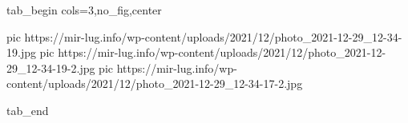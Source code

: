  
 
 
 
 


\ifcmt
  tab_begin cols=3,no_fig,center

     pic https://mir-lug.info/wp-content/uploads/2021/12/photo_2021-12-29_12-34-19.jpg
		 pic https://mir-lug.info/wp-content/uploads/2021/12/photo_2021-12-29_12-34-19-2.jpg
		 pic https://mir-lug.info/wp-content/uploads/2021/12/photo_2021-12-29_12-34-17-2.jpg

  tab_end
\fi
